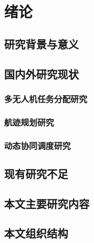 \chapter{绪论}

\section{研究背景与意义}

\section{国内外研究现状}
\subsection{多无人机任务分配研究}
\subsection{航迹规划研究}
\subsection{动态协同调度研究}

\section{现有研究不足}

\section{本文主要研究内容}

\section{本文组织结构}


